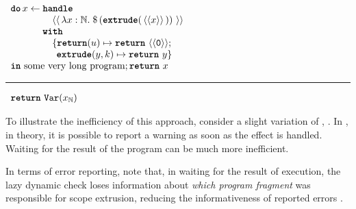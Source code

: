 \begin{code}
  \begin{efflst}
    $\begin{array}{l}
      \textbf{\texttt{do}} \,  x \leftarrow \textbf{\texttt{handle}} \\
      \quad \quad \quad \quad \,\, \equote[\, {\lambda x:\mathbb{N}.\; \splice[\, {(\textbf{\texttt{extrude}}(\, \equote[x] \, ))}\, ]} \, ] \\
      \quad \quad \quad \,\, \textbf{\texttt{with}} \\
      \quad \quad \quad \quad \, \, \{ \textbf{\texttt{return}}(u) \mapsto {\return{\equote[\texttt{0}]}}; \\
      \quad \quad \quad \quad \, \, \; \, \textbf{\texttt{extrude}}(y, k) \mapsto {\return{y}}\}\\
      \textbf{\texttt{in}} \text{ some very long program}; \return{x}
    \end{array}$

    \vspace{2mm} 
\textcolor{effComment}{\hrule height 0.2mm \relax}
\vspace{2mm} 

\textcolor{effComment}{$\begin{array}{l}\return{\Var{x}{\mathbb{N}}}\end{array}$}

\end{efflst}
%
\label{listing:efflang-lazy-scope-extrusion-inefficient}
\end{code}

To illustrate the inefficiency of this approach, consider a slight variation of , . In , in theory, it is possible to report a warning as soon as the effect is handled. Waiting for the result of the program can be much more inefficient. 

In terms of error reporting, note that, in waiting for the result of execution, the lazy dynamic check loses information about \textit{which program fragment} was responsible for scope extrusion, reducing the informativeness of reported errors \citep{kiselyov-14}.  

